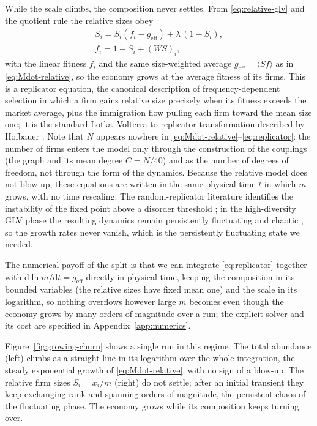 While the scale climbs, the composition never settles. From \eqref{eq:relative-glv} and the quotient
rule the relative sizes obey
\begin{equation}
    \begin{gathered}
        \dot{S}_i = S_i \left( f_i - g_{\mathrm{eff}} \right)
                    + \lambda\,( 1 - S_i ), \\
        f_i = 1 - S_i + (WS)_i ,
    \end{gathered}
    \label{eq:replicator}
\end{equation}
with the linear fitness $f_i$ and the same size-weighted average
$g_{\mathrm{eff}} = \langle S f\rangle$ as in \eqref{eq:Mdot-relative}, so the economy
grows at the average fitness of its firms. This is a
replicator equation, the canonical description of frequency-dependent selection in which a
firm gains relative size precisely when its fitness exceeds the market average, plus the
immigration flow pulling each firm toward the mean size one; it is
the standard Lotka--Volterra-to-replicator transformation described by Hofbauer
\citep{hofbauer81}. Note that $N$ appears nowhere in
\eqref{eq:Mdot-relative}--\eqref{eq:replicator}: the number of firms enters the model only
through the construction of the couplings (the graph and its mean degree $C = N/40$) and
as the number of degrees of freedom, not through the form of the dynamics.
Because the relative model does not blow up, these equations are written in the same
physical time $t$ in which
$m$ grows, with no time rescaling. The random-replicator literature identifies the instability
of the fixed point above a disorder threshold \citep{diederich1989,opperdiederich1992}; in the
high-diversity GLV phase the resulting dynamics remain persistently fluctuating and chaotic
\citep{roy2020,mallmin2024}, so
the growth rates never vanish, which is the persistently fluctuating state we needed.

The numerical payoff of the split is that we can integrate \eqref{eq:replicator}
together with $\mathrm{d}\ln m/\mathrm{d}t = g_{\mathrm{eff}}$
directly in physical time, keeping the composition in its bounded variables (the relative
sizes have fixed mean one) and the scale in its
logarithm, so nothing overflows however large $m$ becomes even though the economy grows by
many orders of magnitude over a run; the explicit solver and its cost
are specified in Appendix~\ref{app:numerics}.

Figure~\ref{fig:growing-churn} shows a single run in this regime. The total abundance
(left)
climbs as a straight line in its logarithm over the whole integration, the steady
exponential growth
of \eqref{eq:Mdot-relative}, with no sign of a blow-up. The relative firm sizes
$S_i = x_i/m$ (right) do not settle; after an initial transient they
keep exchanging rank and spanning orders
of magnitude, the persistent chaos of the fluctuating phase. The economy grows
while its
composition keeps turning over.

